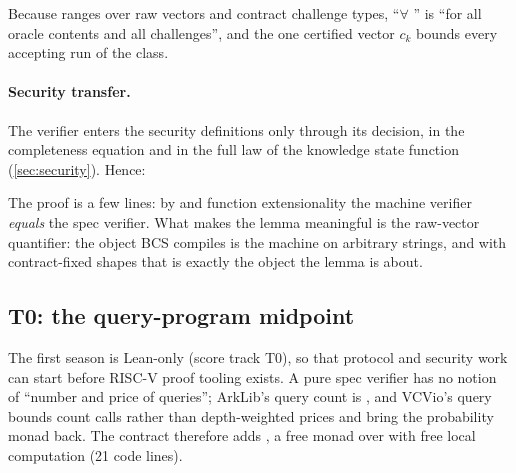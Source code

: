\noindent Because  ranges over raw vectors and contract challenge types,
``$\forall$ '' is ``for all oracle contents and all challenges'', and the one certified
vector $c_k$ bounds every accepting run of the class.

\paragraph{Security transfer.} The verifier enters the security definitions only through its
decision, in the completeness equation and in the \textsf{full} law of the knowledge state function
(\cref{sec:security}). Hence:


\noindent The proof is a few lines: by  and function extensionality the machine
verifier \emph{equals} the spec verifier. What makes the lemma meaningful is the raw-vector
quantifier: the object BCS compiles is the machine on arbitrary strings, and with contract-fixed
shapes that is exactly the object the lemma is about.

\subsection{T0: the query-program midpoint}\label{subsec:proto-qprog}

The first season is Lean-only (score track T0), so that protocol and security work can start
before RISC-V proof tooling exists. A pure spec verifier has no notion of \enquote{number and price
of queries}; ArkLib's query count is , and VCVio's query bounds count calls rather than
depth-weighted prices and bring the probability monad back. The contract therefore adds
, a free monad over  with free local computation (21 code lines).

